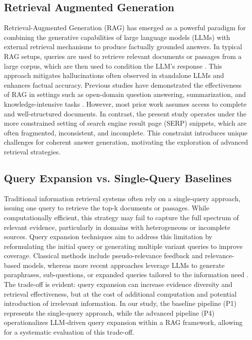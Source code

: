 \documentclass[manuscript,screen]{acmart}
\begin{document}
\begin{CCSXML}
	\subsection{Retrieval Augmented Generation}
	\label{subsec:retrieval-augmented-generation}
	Retrieval-Augmented Generation (RAG) has emerged as a powerful paradigm for combining the generative capabilities of large language models (LLMs) with external retrieval mechanisms to produce factually grounded answers. In typical RAG setups, queries are used to retrieve relevant documents or passages from a large corpus, which are then used to condition the LLM’s response \cite{izacard-grave-2021-leveraging,NEURIPS2020_6b493230}. This approach mitigates hallucinations often observed in standalone LLMs and enhances factual accuracy. Previous studies have demonstrated the effectiveness of RAG in settings such as open-domain question answering, summarization, and knowledge-intensive tasks \cite{karpukhin-etal-2020-dense,guu2020realmretrievalaugmentedlanguagemodel}. However, most prior work assumes access to complete and well-structured documents. In contrast, the present study operates under the more constrained setting of search engine result page (SERP) snippets, which are often fragmented, inconsistent, and incomplete. This constraint introduces unique challenges for coherent answer generation, motivating the exploration of advanced retrieval strategies.
	
	\subsection{Query Expansion vs. Single-Query Baselines}
	\label{subsec:query-expansion-vs-baseline}
	Traditional information retrieval systems often rely on a single-query approach, issuing one query to retrieve the top-k documents or passages. While computationally efficient, this strategy may fail to capture the full spectrum of relevant evidence, particularly in domains with heterogeneous or incomplete sources. Query expansion techniques aim to address this limitation by reformulating the initial query or generating multiple variant queries to improve coverage. Classical methods include pseudo-relevance feedback and relevance-based models, whereas more recent approaches leverage LLMs to generate paraphrases, sub-questions, or expanded queries tailored to the information need \cite{nogueira2020passagererankingbert,wang-etal-2023-query2doc}. The trade-off is evident: query expansion can increase evidence diversity and retrieval effectiveness, but at the cost of additional computation and potential introduction of irrelevant information. In our study, the baseline pipeline (P1) represents the single-query approach, while the advanced pipeline (P4) operationalizes LLM-driven query expansion within a RAG framework, allowing for a systematic evaluation of this trade-off.


\end{CCSXML}
\end{document}
